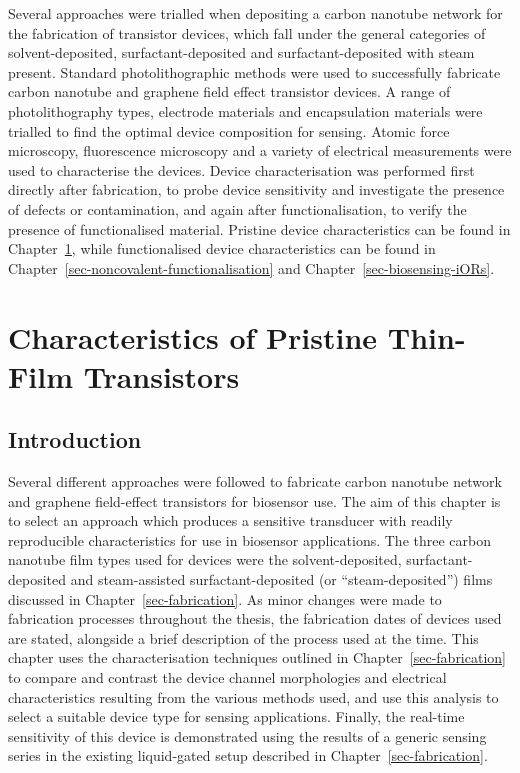 \documentclass[
  a4paper,
]{scrbook}
\begin{document}
Several approaches were trialled when depositing a carbon nanotube
network for the fabrication of transistor devices, which fall under the
general categories of solvent-deposited, surfactant-deposited and
surfactant-deposited with steam present. Standard photolithographic
methods were used to successfully fabricate carbon nanotube and graphene
field effect transistor devices. A range of photolithography types,
electrode materials and encapsulation materials were trialled to find
the optimal device composition for sensing. Atomic force microscopy,
fluorescence microscopy and a variety of electrical measurements were
used to characterise the devices. Device characterisation was performed
first directly after fabrication, to probe device sensitivity and
investigate the presence of defects or contamination, and again after
functionalisation, to verify the presence of functionalised material.
Pristine device characteristics can be found in
Chapter~\ref{sec-pristine-characteristics}, while functionalised device
characteristics can be found in
Chapter~\ref{sec-noncovalent-functionalisation} and
Chapter~\ref{sec-biosensing-iORs}.


\hypertarget{sec-pristine-characteristics}{%
\chapter{Characteristics of Pristine Thin-Film
Transistors}\label{sec-pristine-characteristics}}

\hypertarget{introduction-3}{%
\section{Introduction}\label{introduction-3}}

Several different approaches were followed to fabricate carbon nanotube
network and graphene field-effect transistors for biosensor use. The aim
of this chapter is to select an approach which produces a sensitive
transducer with readily reproducible characteristics for use in
biosensor applications. The three carbon nanotube film types used for
devices were the solvent-deposited, surfactant-deposited and
steam-assisted surfactant-deposited (or ``steam-deposited'') films
discussed in Chapter~\ref{sec-fabrication}. As minor changes were made
to fabrication processes throughout the thesis, the fabrication dates of
devices used are stated, alongside a brief description of the process
used at the time. This chapter uses the characterisation techniques
outlined in Chapter~\ref{sec-fabrication} to compare and contrast the
device channel morphologies and electrical characteristics resulting
from the various methods used, and use this analysis to select a
suitable device type for sensing applications. Finally, the real-time
sensitivity of this device is demonstrated using the results of a
generic sensing series in the existing liquid-gated setup described in
Chapter~\ref{sec-fabrication}.
\end{document}
